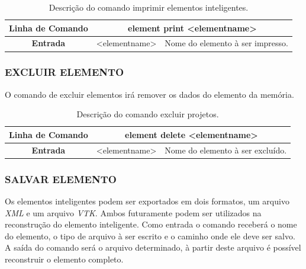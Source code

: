 \documentclass[a4paper,12pt]{monografia}
\theoremstyle{plain}
\theoremstyle{definition}
\theoremstyle{remark}
\begin{document}
\begin{center}
\begin{table}[!htbp]
	\begin{tabular}{|c|c|m{}|}
		\hline
		\textbf{Linha de Comando} & \multicolumn{2}{c|}{element print <element\underline{\space\space}name>} \\
		\hline
		\textbf{Entrada} & <element\underline{\space\space}name> & Nome do elemento à ser impresso. \\
		\hline
	\end{tabular}
	\caption{Descrição do comando imprimir elementos inteligentes.}
	\label{tab:print_element}
\end{table}
\end{center}

\subsubsection{EXCLUIR ELEMENTO}\label{sec:delete_element}

O comando de excluir elementos irá remover os dados do elemento da memória.

\begin{center}
\begin{table}[!htbp]
	\begin{tabular}{|c|c|m{}|}
		\hline
		\textbf{Linha de Comando} & \multicolumn{2}{c|}{element delete <element\underline{\space\space}name>} \\
		\hline
		\textbf{Entrada} & <element\underline{\space\space}name> & Nome do elemento à ser excluído. \\
		\hline
	\end{tabular}
	\caption{Descrição do comando excluir projetos.}
	\label{tab:delete_element}
\end{table}
\end{center}

\subsubsection{SALVAR ELEMENTO}\label{sec:save_element}

Os elementos inteligentes podem ser exportados em dois formatos, um arquivo \textit{XML} e um arquivo \textit{VTK}. Ambos futuramente podem ser utilizados na reconstrução do elemento inteligente. Como entrada o comando receberá o nome do elemento, o tipo de arquivo à ser escrito e o caminho onde ele deve ser salvo. A saída do comando será o arquivo determinado, à partir deste arquivo é possível reconstruir o elemento completo.
\end{document}
